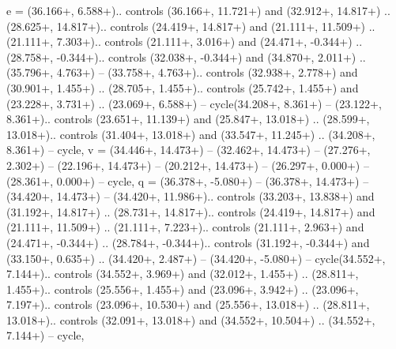 {e} = {(36.166+\ctpXshift, 6.588+\ctpYshift).. controls (36.166+\ctpXshift, 11.721+\ctpYshift) and (32.912+\ctpXshift, 14.817+\ctpYshift) .. (28.625+\ctpXshift, 14.817+\ctpYshift).. controls (24.419+\ctpXshift, 14.817+\ctpYshift) and (21.111+\ctpXshift, 11.509+\ctpYshift) .. (21.111+\ctpXshift, 7.303+\ctpYshift).. controls (21.111+\ctpXshift, 3.016+\ctpYshift) and (24.471+\ctpXshift, -0.344+\ctpYshift) .. (28.758+\ctpXshift, -0.344+\ctpYshift).. controls (32.038+\ctpXshift, -0.344+\ctpYshift) and (34.870+\ctpXshift, 2.011+\ctpYshift) .. (35.796+\ctpXshift, 4.763+\ctpYshift) -- (33.758+\ctpXshift, 4.763+\ctpYshift).. controls (32.938+\ctpXshift, 2.778+\ctpYshift) and (30.901+\ctpXshift, 1.455+\ctpYshift) .. (28.705+\ctpXshift, 1.455+\ctpYshift).. controls (25.742+\ctpXshift, 1.455+\ctpYshift) and (23.228+\ctpXshift, 3.731+\ctpYshift) .. (23.069+\ctpXshift, 6.588+\ctpYshift) -- cycle(34.208+\ctpXshift, 8.361+\ctpYshift) -- (23.122+\ctpXshift, 8.361+\ctpYshift).. controls (23.651+\ctpXshift, 11.139+\ctpYshift) and (25.847+\ctpXshift, 13.018+\ctpYshift) .. (28.599+\ctpXshift, 13.018+\ctpYshift).. controls (31.404+\ctpXshift, 13.018+\ctpYshift) and (33.547+\ctpXshift, 11.245+\ctpYshift) .. (34.208+\ctpXshift, 8.361+\ctpYshift) -- cycle},
{v} = {(34.446+\ctpXshift, 14.473+\ctpYshift) -- (32.462+\ctpXshift, 14.473+\ctpYshift) -- (27.276+\ctpXshift, 2.302+\ctpYshift) -- (22.196+\ctpXshift, 14.473+\ctpYshift) -- (20.212+\ctpXshift, 14.473+\ctpYshift) -- (26.297+\ctpXshift, 0.000+\ctpYshift) -- (28.361+\ctpXshift, 0.000+\ctpYshift) -- cycle},
{q} = {(36.378+\ctpXshift, -5.080+\ctpYshift) -- (36.378+\ctpXshift, 14.473+\ctpYshift) -- (34.420+\ctpXshift, 14.473+\ctpYshift) -- (34.420+\ctpXshift, 11.986+\ctpYshift).. controls (33.203+\ctpXshift, 13.838+\ctpYshift) and (31.192+\ctpXshift, 14.817+\ctpYshift) .. (28.731+\ctpXshift, 14.817+\ctpYshift).. controls (24.419+\ctpXshift, 14.817+\ctpYshift) and (21.111+\ctpXshift, 11.509+\ctpYshift) .. (21.111+\ctpXshift, 7.223+\ctpYshift).. controls (21.111+\ctpXshift, 2.963+\ctpYshift) and (24.471+\ctpXshift, -0.344+\ctpYshift) .. (28.784+\ctpXshift, -0.344+\ctpYshift).. controls (31.192+\ctpXshift, -0.344+\ctpYshift) and (33.150+\ctpXshift, 0.635+\ctpYshift) .. (34.420+\ctpXshift, 2.487+\ctpYshift) -- (34.420+\ctpXshift, -5.080+\ctpYshift) -- cycle(34.552+\ctpXshift, 7.144+\ctpYshift).. controls (34.552+\ctpXshift, 3.969+\ctpYshift) and (32.012+\ctpXshift, 1.455+\ctpYshift) .. (28.811+\ctpXshift, 1.455+\ctpYshift).. controls (25.556+\ctpXshift, 1.455+\ctpYshift) and (23.096+\ctpXshift, 3.942+\ctpYshift) .. (23.096+\ctpXshift, 7.197+\ctpYshift).. controls (23.096+\ctpXshift, 10.530+\ctpYshift) and (25.556+\ctpXshift, 13.018+\ctpYshift) .. (28.811+\ctpXshift, 13.018+\ctpYshift).. controls (32.091+\ctpXshift, 13.018+\ctpYshift) and (34.552+\ctpXshift, 10.504+\ctpYshift) .. (34.552+\ctpXshift, 7.144+\ctpYshift) -- cycle},
